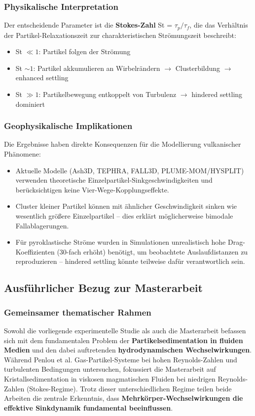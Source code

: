 \documentclass[a4paper,12pt]{article}
\begin{document}
\subsubsection*{Physikalische Interpretation}
Der entscheidende Parameter ist die \textbf{Stokes-Zahl} St = $\tau_p / \tau_f$, die das Verh\"altnis der Partikel-Relaxationszeit zur charakteristischen Str\"omungszeit beschreibt:
\begin{itemize}
    \item St $\ll 1$: Partikel folgen der Str\"omung
    \item St $\sim 1$: Partikel akkumulieren an Wirbelr\"andern $\rightarrow$ Clusterbildung $\rightarrow$ enhanced settling
    \item St $\gg 1$: Partikelbewegung entkoppelt von Turbulenz $\rightarrow$ hindered settling dominiert
\end{itemize}

\subsubsection*{Geophysikalische Implikationen}
Die Ergebnisse haben direkte Konsequenzen f\"ur die Modellierung vulkanischer Ph\"anomene:
\begin{itemize}
    \item Aktuelle Modelle (Ash3D, TEPHRA, FALL3D, PLUME-MOM/HYSPLIT) verwenden theoretische Einzelpartikel-Sinkgeschwindigkeiten und ber\"ucksichtigen keine Vier-Wege-Kopplungseffekte.
    \item Cluster kleiner Partikel k\"onnen mit \"ahnlicher Geschwindigkeit sinken wie wesentlich gr\"o\ss{}ere Einzelpartikel -- dies erkl\"art m\"oglicherweise bimodale Fallablagerungen.
    \item F\"ur pyroklastische Str\"ome wurden in Simulationen unrealistisch hohe Drag-Koeffizienten (30-fach erh\"oht) ben\"otigt, um beobachtete Auslaufdistanzen zu reproduzieren -- hindered settling k\"onnte teilweise daf\"ur verantwortlich sein.
\end{itemize}

\subsection*{Ausf\"uhrlicher Bezug zur Masterarbeit}

\subsubsection*{Gemeinsamer thematischer Rahmen}
Sowohl die vorliegende experimentelle Studie als auch die Masterarbeit befassen sich mit dem fundamentalen Problem der \textbf{Partikelsedimentation in fluiden Medien} und den dabei auftretenden \textbf{hydrodynamischen Wechselwirkungen}. W\"ahrend Penlou et al. Gas-Partikel-Systeme bei hohen Reynolds-Zahlen und turbulenten Bedingungen untersuchen, fokussiert die Masterarbeit auf Kristallsedimentation in viskosen magmatischen Fluiden bei niedrigen Reynolds-Zahlen (Stokes-Regime). Trotz dieser unterschiedlichen Regime teilen beide Arbeiten die zentrale Erkenntnis, dass \textbf{Mehrkörper-Wechselwirkungen die effektive Sinkdynamik fundamental beeinflussen}.
\end{document}
